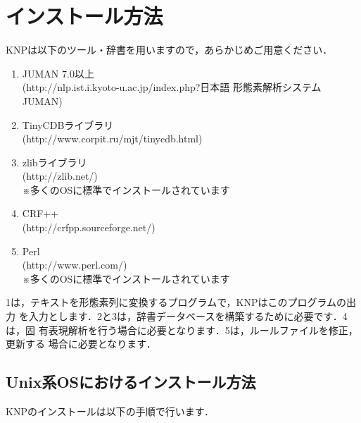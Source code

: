 \documentclass[a4j,11pt,titlepage]{jarticle}
\begin{document}
\section{インストール方法}

KNPは以下のツール・辞書を用いますので，あらかじめご用意ください．

\begin{enumerate}
 \item JUMAN 7.0以上 \\ (http://nlp.ist.i.kyoto-u.ac.jp/index.php?日本語
       形態素解析システムJUMAN)
 \item TinyCDBライブラリ \\ (http://www.corpit.ru/mjt/tinycdb.html)
 \item zlibライブラリ \\ (http://zlib.net/) \\
       ※多くのOSに標準でインストールされています
 \item CRF++ \\ (http://crfpp.sourceforge.net/)
 \item Perl \\ (http://www.perl.com/) \\
       ※多くのOSに標準でインストールされています
\end{enumerate}
1は，テキストを形態素列に変換するプログラムで，KNPはこのプログラムの出力
を入力とします．2と3は，辞書データベースを構築するために必要です．4は，固
有表現解析を行う場合に必要となります．5は，ルールファイルを修正，更新する
場合に必要となります．


\subsection{Unix系OSにおけるインストール方法}

KNPのインストールは以下の手順で行います．
\end{document}
